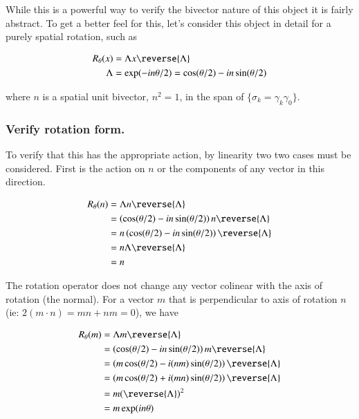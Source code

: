 While this is a powerful way to verify the bivector nature of this object it is fairly abstract.  To get a better feel for this, let's 
consider this object in detail for a purely spatial rotation, such as

\begin{align*}
R_\theta(x) &= \Lambda x \reverse{\Lambda} \\
\Lambda &= \exp( -i n \theta/ 2 ) = \cos( \theta/ 2 ) - i n \sin( \theta/ 2 )
\end{align*}

where $n$ is a spatial unit bivector, $n^2 = 1$, in the span of $\{\sigma_k = \gamma_k \gamma_0\}$.

\subsubsection{Verify rotation form. }

To verify that this has the appropriate action, by linearity two two cases must be considered.  
First is the action on $n$ or the components of any vector in this direction.

\begin{align*}
R_\theta(n) 
&= \Lambda n \reverse{\Lambda} \\
&= \left( \cos( \theta/ 2 ) - i n \sin( \theta/ 2 ) \right) n \reverse{\Lambda} \\
&= n \left( \cos( \theta/ 2 ) - i n \sin( \theta/ 2 ) \right) \reverse{\Lambda} \\
&= n \Lambda \reverse{\Lambda} \\
&= n \\
\end{align*}

The rotation operator does not change any vector colinear with the axis of rotation (the normal).  For a 
vector $m$ that is perpendicular to axis of rotation $n$ (ie: $2 ( m \cdot n ) = mn + nm = 0 $), we have

\begin{align*}
R_\theta(m) 
&= \Lambda m \reverse{\Lambda} \\
&= \left( \cos( \theta/ 2 ) - i n \sin( \theta/ 2 ) \right) m \reverse{\Lambda} \\
&= \left( m \cos( \theta/ 2 ) - i (n m) \sin( \theta/ 2 ) \right) \reverse{\Lambda} \\
&= \left( m \cos( \theta/ 2 ) + i (m n) \sin( \theta/ 2 ) \right) \reverse{\Lambda} \\
&= m (\reverse{\Lambda})^2 \\
&= m \exp( i n \theta )
\end{align*}

